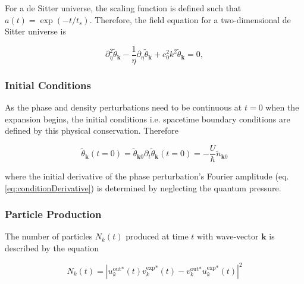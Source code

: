 \documentclass{article}
\begin{document}
            For a de Sitter universe, the scaling function is defined such that $a(t) = \exp(-t / t_s)$.  Therefore, the field equation for a two-dimensional de Sitter universe is

            \begin{equation} \label{eq:fieldEquationdeSitter}
                \partial_\eta^2 \widetilde{\theta}_\mathbf{k} - \frac{1}{\eta} \partial_\eta \widetilde{\theta}_\mathbf{k} + c_0^2 k^2 \widetilde{\theta}_\mathbf{k} = 0,
            \end{equation}

        \subsubsection{Initial Conditions}

            As the phase and density perturbations need to be continuous at $t = 0$ when the expansion begins, the initial conditions i.e. spacetime boundary conditions are defined by this physical conservation.  Therefore

            \begin{subequations}
                \begin{equation} \label{eq:conditionValue}
                    \widetilde{\theta}_\mathbf{k}(t = 0) = \widetilde{\theta}_{\mathbf{k}0}
                \end{equation}
                \begin{equation} \label{eq:conditionDerivative}
                    \partial_t \widetilde{\theta}_\mathbf{k}(t = 0) = -\frac{U}{\hbar} \widetilde{n}_{\mathbf{k}0}
                \end{equation}
            \end{subequations}

            where the initial derivative of the phase perturbation's Fourier amplitude (eq. \ref{eq:conditionDerivative}) is determined by neglecting the quantum pressure\cite{Jain}.

        \subsubsection{Particle Production} \label{sec:particleProduction}

            The number of particles $N_k(t)$ produced at time $t$ with wave-vector $\mathbf{k}$ is described by the equation

            \begin{equation} \label{eq:particleProduction}
                N_k(t) = \left| u_k^{\text{out} *}(t) v_k^{\text{exp} *}(t) - v_k^{\text{out} *} u_k^{\text{exp} *}(t) \right|^2
            \end{equation}
\end{document}
